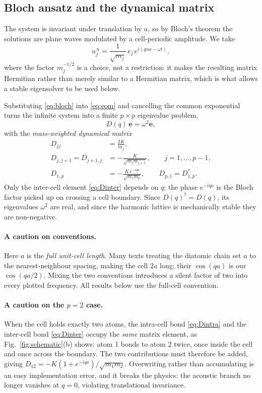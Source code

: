 \documentclass[aps,prb,reprint,nofootinbib]{revtex4-2}
\begin{document}
\subsection{Bloch ansatz and the dynamical matrix}

The system is invariant under translation by $a$, so by Bloch's theorem the solutions are plane
waves modulated by a cell-periodic amplitude. We take
\begin{equation}
  u_j^{\,n} = \frac{1}{\sqrt{m_j}}\, e_j \, e^{i(qna - \omega t)},
  \label{eq:bloch}
\end{equation}
where the factor $m_j^{-1/2}$ is a choice, not a restriction: it makes the resulting matrix
Hermitian rather than merely similar to a Hermitian matrix, which is what allows a stable
eigensolver to be used below.

Substituting \eqref{eq:bloch} into \eqref{eq:eom} and cancelling the common exponential turns the
infinite system into a finite $p \times p$ eigenvalue problem,
\begin{equation}
  D(q)\, \mathbf{e} = \omega^2 \mathbf{e},
  \label{eq:eigen}
\end{equation}
with the \emph{mass-weighted dynamical matrix}
\begin{align}
  D_{jj}     &= \frac{2K}{m_j}, \label{eq:Ddiag}\\
  D_{j,j+1} = D_{j+1,j} &= -\frac{K}{\sqrt{m_j m_{j+1}}}, \qquad j = 1,\dots,p-1, \label{eq:Dintra}\\
  D_{1,p}    &= -\frac{K\,e^{-iqa}}{\sqrt{m_1 m_p}}, \qquad D_{p,1} = D_{1,p}^{*}. \label{eq:Dinter}
\end{align}
Only the inter-cell element \eqref{eq:Dinter} depends on $q$; the phase $e^{-iqa}$ is the
Bloch factor picked up on crossing a cell boundary. Since $D(q)^\dagger = D(q)$, its eigenvalues
$\omega^2$ are real, and since the harmonic lattice is mechanically stable they are
non-negative.

\paragraph{A caution on conventions.} Here $a$ is the \emph{full unit-cell length}. Many texts
treating the diatomic chain set $a$ to the nearest-neighbour spacing, making the cell $2a$ long;
their $\cos(qa)$ is our $\cos(qa/2)$. Mixing the two conventions introduces a silent factor of
two into every plotted frequency. All results below use the full-cell convention.

\paragraph{A caution on the $p=2$ case.} When the cell holds exactly two atoms, the intra-cell
bond \eqref{eq:Dintra} and the inter-cell bond \eqref{eq:Dinter} occupy the \emph{same} matrix
element, as Fig.~\ref{fig:schematic}(b) shows: atom 1 bonds to atom 2 twice, once inside the cell and once across the boundary. The two
contributions must therefore be added, giving
$D_{12} = -K\left(1 + e^{-iqa}\right)/\sqrt{m_1 m_2}$. Overwriting rather than accumulating is an
easy implementation error, and it breaks the physics: the acoustic branch no longer vanishes at
$q=0$, violating translational invariance.
\end{document}
